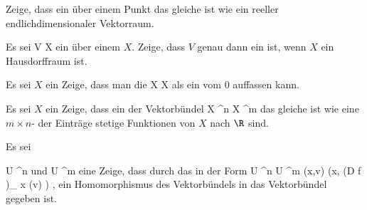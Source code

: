 {}
{





Zeige, dass ein
über einem Punkt
 {} {}
das gleiche ist wie ein reeller endlichdimensionaler Vektorraum.





}
{} {}

{}
{





Es sei
 { V } { X
} {}
ein
über einem
$X$. Zeige, dass $V$ genau dann ein
ist, wenn $X$ ein Hausdorffraum ist.





}
{} {}

{}
{





Es sei $X$ ein
Zeige, dass man die
 { X } { X
} {}
als ein
vom
$0$ auffassen kann.





}
{} {}

{}
{





Es sei $X$ ein
Zeige, dass ein
der
 {} {}
Vektorbündel
\maabbdisp {\varphi} {X \times \R^n } { X \times \R^m
} {}
das gleiche ist wie eine
$m \times n$-
der Einträge stetige Funktionen von $X$ nach $\R$ sind.





}
{} {}

{}
{





Es sei

\mavergleichskette
{\vergleichskette
{U
}
{ \subseteq }{ \R^n
}
{  }{
}
{    }{
}
{   }{
}
}
{}{}{}
und
 { U } { \R^m
} {}
eine
Zeige, dass durch das
in der Form
\maabbeledisp {} { U \times \R^n } { U \times \R^m
} { (x,v)} { (x, \left(D f \right)_{ x} (v) )
} {,}
ein Homomorphismus des Vektorbündels
 in das Vektorbündel
  gegeben ist.





}
{} {}

